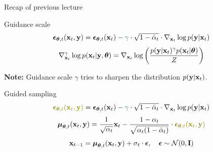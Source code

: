 \begin{frame}{Recap of previous lecture}
	\begin{block}{Guidance scale}
		\vspace{-0.3cm}
		\[
			\boldsymbol{\epsilon}_{\boldsymbol{\theta}, t}(\mathbf{x}_t, \mathbf{y}) = \boldsymbol{\epsilon}_{\boldsymbol{\theta}, t}(\mathbf{x}_t) - {\color{teal}\gamma} \cdot \sqrt{1 - \bar{\alpha}_t} \cdot \nabla_{\mathbf{x}_t} \log p(\mathbf{y} | \mathbf{x}_t)
		\]
		\[
			\nabla_{\mathbf{x}_t}^{\gamma} \log p(\mathbf{x}_t | \mathbf{y}, \boldsymbol{\theta}) = \nabla_{\mathbf{x}_t} \log \left( \frac{p(\mathbf{y} | \mathbf{x}_t)^{\gamma} p(\mathbf{x}_t | \boldsymbol{\theta})}{Z} \right)
		\]
		\vspace{-0.5cm}
	\end{block}
	\textbf{Note:} Guidance scale $\gamma$ tries to sharpen the distribution $p(\mathbf{y} | \mathbf{x}_t)$.
	\begin{block}{Guided sampling}
		\[
			{\color{olive}\bepsilon_{\btheta, t}(\bx_t, \by)} = \bepsilon_{\btheta, t}(\bx_t) - {\color{teal}\gamma} \cdot \sqrt{1 - \bar{\alpha}_t} \cdot \nabla_{\bx_t} \log p(\by | \bx_t)
		\]
		\[
			\bmu_{\btheta, t}(\bx_t, \by) = \frac{1}{\sqrt{\alpha_t}} \bx_t - \frac{1 - \alpha_t}{\sqrt{\alpha_t (1 - \bar{\alpha}_t)}} \cdot  	{\color{olive}\bepsilon_{\btheta, t}(\bx_t, \by)}
		\]
		\[
			\mathbf{x}_{t - 1} = \boldsymbol{\mu}_{\boldsymbol{\theta}, t}(\mathbf{x}_t, \mathbf{y}) + \sigma_t \cdot \boldsymbol{\epsilon}, \quad \boldsymbol{\epsilon} \sim \mathcal{N}(0, \mathbf{I})
		\]
	\end{block}
\end{frame}
